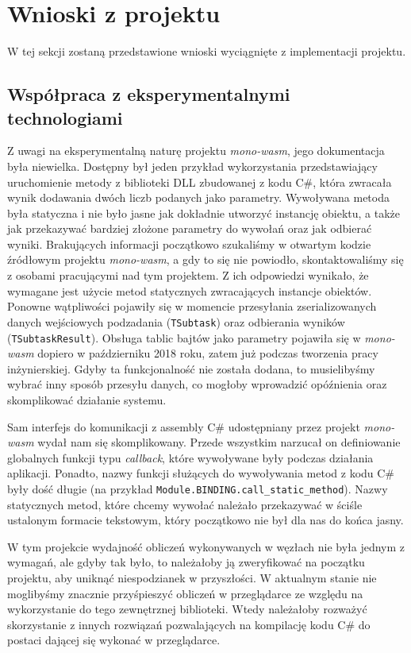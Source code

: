\documentclass[a4paper,11pt,twoside]{report}
\theoremstyle{definition}
\begin{document}
    
    \section{Wnioski z projektu}
        W tej sekcji zostaną przedstawione wnioski wyciągnięte z implementacji projektu.
        
        \subsection{Współpraca z eksperymentalnymi technologiami}
            Z uwagi na eksperymentalną naturę projektu \textit{mono-wasm}, jego dokumentacja była niewielka. Dostępny był jeden przykład wykorzystania przedstawiający uruchomienie metody z biblioteki DLL zbudowanej z kodu C\#, która zwracała wynik dodawania dwóch liczb podanych jako parametry.
            Wywoływana metoda była statyczna i nie było jasne jak dokładnie utworzyć instancję obiektu, a także jak przekazywać bardziej złożone parametry do wywołań oraz jak odbierać wyniki. Brakujących informacji początkowo szukaliśmy w otwartym kodzie źródłowym projektu \textit{mono-wasm}, a gdy to się nie powiodło, skontaktowaliśmy się z osobami pracującymi nad tym projektem. Z ich odpowiedzi wynikało, że wymagane jest użycie metod statycznych zwracających instancje obiektów.
            Ponowne wątpliwości pojawiły się w momencie przesyłania zserializowanych danych wejściowych podzadania (\texttt{TSubtask}) oraz odbierania wyników (\texttt{TSubtaskResult}). Obsługa tablic bajtów jako parametry pojawiła się w \textit{mono-wasm} dopiero w październiku 2018 roku, zatem już podczas tworzenia pracy inżynierskiej.
            Gdyby ta funkcjonalność nie została dodana, to musielibyśmy wybrać inny sposób przesyłu danych, co mogłoby wprowadzić opóźnienia oraz skomplikować działanie systemu.
            
            Sam interfejs do komunikacji z assembly C\# udostępniany przez projekt \textit{mono-wasm} wydał nam się skomplikowany. Przede wszystkim narzucał on definiowanie globalnych funkcji typu \textit{callback}, które wywoływane były podczas działania aplikacji. Ponadto, nazwy funkcji służących do wywoływania metod z kodu C\# były dość długie (na przykład \texttt{Module.BINDING.call\_static\_method}). Nazwy statycznych metod, które chcemy wywołać należało przekazywać w ściśle ustalonym formacie tekstowym, który początkowo nie był dla nas do końca jasny.
            
            W tym projekcie wydajność obliczeń wykonywanych w węzłach nie była jednym z wymagań, ale gdyby tak było, to należałoby ją zweryfikować na początku projektu, aby uniknąć niespodzianek w przyszłości. W aktualnym stanie nie moglibyśmy znacznie przyśpieszyć obliczeń w przeglądarce ze względu na wykorzystanie do tego zewnętrznej biblioteki. Wtedy należałoby rozważyć skorzystanie z innych rozwiązań pozwalających na kompilację kodu C\# do postaci dającej się wykonać w przeglądarce.
            
\end{document}
